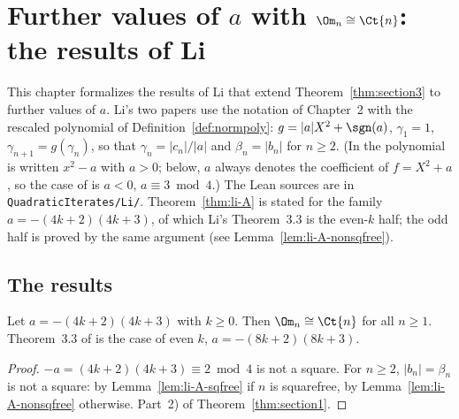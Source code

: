 \chapter{\texorpdfstring{Further values of $a$ with $\Om_n \cong \Ct{n}$: the results of Li}{Further
  values of a with the full wreath power: the results of Li}}
\label{chap:li}

This chapter formalizes the results of Li \cite{li2020, li2021} that extend
Theorem~\ref{thm:section3} to further values of $a$. Li's two papers use the notation of
Chapter~2 with the rescaled polynomial of Definition~\ref{def:normpoly}:
$g = |a| X^2 + \sgn(a)$, $\gamma_1 = 1$, $\gamma_{n+1} = g(\gamma_n)$, so that
$\gamma_n = |c_n|/|a|$ and $\beta_n = |b_n|$ for $n \ge 2$. (In \cite{li2020} the polynomial is
written $x^2 - a$ with $a > 0$; below, $a$ always denotes the coefficient of $f = X^2 + a$, so the
case of \cite{li2020} is $a < 0$, $a \equiv 3 \bmod 4$.) The Lean sources are in
\texttt{QuadraticIterates/Li/}. Theorem~\ref{thm:li-A} is stated for the family
$a = -(4k+2)(4k+3)$, of which Li's Theorem~3.3 is the even-$k$ half; the odd half is proved by
the same argument (see Lemma~\ref{lem:li-A-nonsqfree}).

\section{The results}

\begin{theorem}
  \label{thm:li-A}
  \leanok
  Let $a = -(4k+2)(4k+3)$ with $k \ge 0$. Then $\Om_n \cong \Ct{n}$ for all $n \ge 1$.
  Theorem~3.3 of \cite{li2021} is the case of even $k$, $a = -(8k+2)(8k+3)$.
\end{theorem}
\begin{proof}
  \leanok
  $-a = (4k+2)(4k+3) \equiv 2 \bmod 4$ is not a square. For $n \ge 2$, $|b_n| = \beta_n$ is not a
  square: by Lemma~\ref{lem:li-A-sqfree} if $n$ is squarefree, by
  Lemma~\ref{lem:li-A-nonsqfree} otherwise. Part~2) of Theorem~\ref{thm:section1}.
\end{proof}

